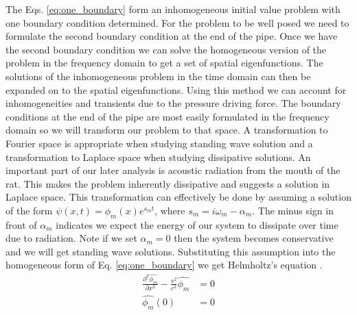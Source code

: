 \documentclass[12pt, letter]{report}
\begin{document}
The Eqs. \ref{eq:one_boundary} form an inhomogeneous initial value problem with one boundary condition determined. For the problem to be well posed we need to formulate the second boundary condition at the end of the pipe. Once we have the second boundary condition we can solve the homogeneous version of the problem in the frequency domain to get a set of spatial eigenfunctions. The solutions of the inhomogeneous problem in the time domain can then be expanded on to the spatial eigenfunctions. Using this method we can account for inhomogeneities and transients due to the pressure driving force. The boundary conditions at the end of the pipe are most easily formulated in the frequency domain so we will transform our problem to that space. A transformation to Fourier space is appropriate when studying standing wave solution and a transformation to Laplace space when studying dissipative solutions. An important part of our later analysis is acoustic radiation from the mouth of the rat. This makes the problem inherently dissipative and suggests a solution in Laplace space. This transformation can effectively be done by assuming a solution of the form $\psi(x,t)=\phi_m(x) e^{s_m t}$, where $s_m = i\omega_m - \alpha_m$. The minus sign in front of $\alpha_m$ indicates we expect the energy of our system to dissipate over time due to radiation. Note if we set $\alpha_m=0$ then the system becomes conservative and we will get standing wave solutions. Substituting this assumption into the homogeneous form of Eq. \ref{eq:one_boundary} we get Helmholtz's equation \cite{fletcher2012physics}.
\begin{equation}
\label{eq:helmholtz}
\begin{split}
\frac{\partial^2 \hat{\phi_m}}{\partial x^2} - \frac{s^2}{c^2} \hat{\phi_m} &= 0 \\
\hat{\phi_m}(0) &= 0
\end{split}
\end{equation}
\end{document}
